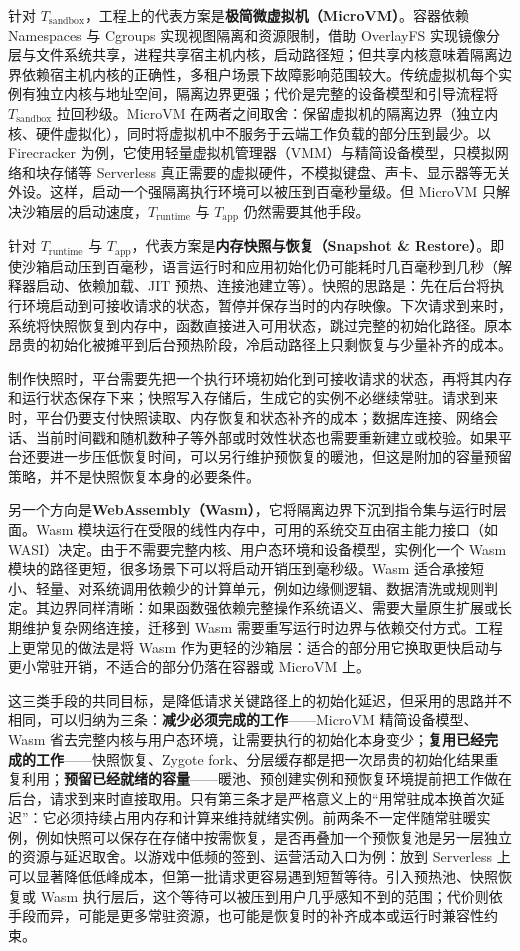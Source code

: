 针对 $T_{\mathrm{sandbox}}$，工程上的代表方案是\textbf{极简微虚拟机（MicroVM）}。容器依赖 Namespaces 与 Cgroups 实现视图隔离和资源限制，借助 OverlayFS 实现镜像分层与文件系统共享，进程共享宿主机内核，启动路径短；但共享内核意味着隔离边界依赖宿主机内核的正确性，多租户场景下故障影响范围较大。传统虚拟机每个实例有独立内核与地址空间，隔离边界更强；代价是完整的设备模型和引导流程将 $T_{\mathrm{sandbox}}$ 拉回秒级。MicroVM 在两者之间取舍：保留虚拟机的隔离边界（独立内核、硬件虚拟化），同时将虚拟机中不服务于云端工作负载的部分压到最少。以 Firecracker 为例，它使用轻量虚拟机管理器（VMM）与精简设备模型，只模拟网络和块存储等 Serverless 真正需要的虚拟硬件，不模拟键盘、声卡、显示器等无关外设。这样，启动一个强隔离执行环境可以被压到百毫秒量级。但 MicroVM 只解决沙箱层的启动速度，$T_{\mathrm{runtime}}$ 与 $T_{\mathrm{app}}$ 仍然需要其他手段。

针对 $T_{\mathrm{runtime}}$ 与 $T_{\mathrm{app}}$，代表方案是\textbf{内存快照与恢复（Snapshot \& Restore）}。即使沙箱启动压到百毫秒，语言运行时和应用初始化仍可能耗时几百毫秒到几秒（解释器启动、依赖加载、JIT 预热、连接池建立等）。快照的思路是：先在后台将执行环境启动到可接收请求的状态，暂停并保存当时的内存映像。下次请求到来时，系统将快照恢复到内存中，函数直接进入可用状态，跳过完整的初始化路径。原本昂贵的初始化被摊平到后台预热阶段，冷启动路径上只剩恢复与少量补齐的成本。

制作快照时，平台需要先把一个执行环境初始化到可接收请求的状态，再将其内存和运行状态保存下来；快照写入存储后，生成它的实例不必继续常驻。请求到来时，平台仍要支付快照读取、内存恢复和状态补齐的成本；数据库连接、网络会话、当前时间戳和随机数种子等外部或时效性状态也需要重新建立或校验。如果平台还要进一步压低恢复时间，可以另行维护预恢复的暖池，但这是附加的容量预留策略，并不是快照恢复本身的必要条件。

另一个方向是\textbf{WebAssembly（Wasm）}，它将隔离边界下沉到指令集与运行时层面。Wasm 模块运行在受限的线性内存中，可用的系统交互由宿主能力接口（如 WASI）决定。由于不需要完整内核、用户态环境和设备模型，实例化一个 Wasm 模块的路径更短，很多场景下可以将启动开销压到毫秒级。Wasm 适合承接短小、轻量、对系统调用依赖少的计算单元，例如边缘侧逻辑、数据清洗或规则判定。其边界同样清晰：如果函数强依赖完整操作系统语义、需要大量原生扩展或长期维护复杂网络连接，迁移到 Wasm 需要重写运行时边界与依赖交付方式。工程上更常见的做法是将 Wasm 作为更轻的沙箱层：适合的部分用它换取更快启动与更小常驻开销，不适合的部分仍落在容器或 MicroVM 上。

这三类手段的共同目标，是降低请求关键路径上的初始化延迟，但采用的思路并不相同，可以归纳为三条：\textbf{减少必须完成的工作}——MicroVM 精简设备模型、Wasm 省去完整内核与用户态环境，让需要执行的初始化本身变少；\textbf{复用已经完成的工作}——快照恢复、Zygote fork、分层缓存都是把一次昂贵的初始化结果重复利用；\textbf{预留已经就绪的容量}——暖池、预创建实例和预恢复环境提前把工作做在后台，请求到来时直接取用。只有第三条才是严格意义上的“用常驻成本换首次延迟”：它必须持续占用内存和计算来维持就绪实例。前两条不一定伴随常驻暖实例，例如快照可以保存在存储中按需恢复，是否再叠加一个预恢复池是另一层独立的资源与延迟取舍。以游戏中低频的签到、运营活动入口为例：放到 Serverless 上可以显著降低低峰成本，但第一批请求更容易遇到短暂等待。引入预热池、快照恢复或 Wasm 执行层后，这个等待可以被压到用户几乎感知不到的范围；代价则依手段而异，可能是更多常驻资源，也可能是恢复时的补齐成本或运行时兼容性约束。

